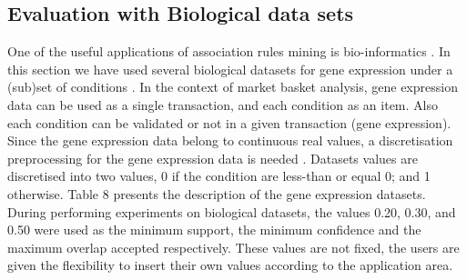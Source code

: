 \documentclass[preprint,12pt]{elsarticle}
\begin{document}
\subsection{ Evaluation with Biological data sets}
One of the useful applications of association rules mining is bio-informatics \cite{31}. 
In this section we have used several biological datasets for gene expression under a (sub)set of 
conditions \cite{32,29}. In the context of market basket analysis, gene expression data can be used as a single transaction, 
and each condition as an item.  Also each condition can be validated or not in a given transaction (gene expression).  
Since the gene expression data belong to continuous real values, a discretisation  preprocessing for the gene expression data is needed \cite{33}.
 Datasets values are discretised into two values, 0 if the condition are less-than or equal 0; and 1 otherwise. Table 8 presents the description of the gene expression datasets. During performing experiments on biological datasets, the values 0.20, 0.30, and 0.50 were used as the minimum support, the minimum confidence and the maximum overlap accepted respectively. These values are not fixed, the users are given the flexibility to insert their own values according to the application area.
 
\end{document}
